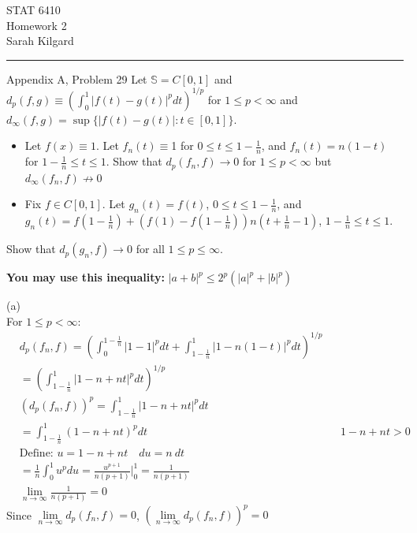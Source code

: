 \documentclass[12pt,letterpaper, onecolumn]{exam}
\newcommand{\Sbb}{\mathbb{S}}
\begin{document}
\begingroup  
    \centering
    \LARGE STAT 6410\\
    \LARGE Homework 2\\[0.5em]
    \large Sarah Kilgard\par
\endgroup
\rule{\textwidth}{0.4pt}
\pointsdroppedatright   %
\printanswers
\renewcommand{\solutiontitle}{\noindent\textbf{Ans:}\enspace}   %

\begin{questions}
    \question Appendix A, Problem 29
    Let $\Sbb = C[0, 1]$ and $d_p(f,g) \equiv (\int_0^1|f(t) - g(t)|^p dt)^{1/p}$ for $1 \leq p < \infty$ and $d_\infty(f,g) = \sup\{|f(t) - g(t)| : t \in [0, 1]\}$.
    \begin{itemize}
    \item[(a)] Let $f(x) \equiv 1$. Let $f_n(t) \equiv $1 for $0 \leq t \leq 1 - \frac{1}{n}$, and $f_n(t)=n(1-t)$ for $1 - \frac{1}{n} \leq t \leq 1$. Show that $d_p(f_n,f) \to 0$ for $1 \leq p < \infty$ but $d_\infty(f_n,f) \nrightarrow 0$
    \item[(b)] Fix $f \in C[0, 1]$. Let $g_n(t)=f(t)$, $0 \leq t \leq 1 - \frac{1}{n}$, and $g_n(t)= f(1 - \frac{1}{n})+(f(1) - f(1 - \frac{1}{n}))n(t + \frac{1}{n} - 1)$, $1 - \frac{1}{n} \leq t \leq 1$.
    \end{itemize}
    Show that $d_p(g_n,f) \to 0$  for all  $1\leq p \leq \infty$.

    \textbf{You may use this inequality:} $|a + b|^p \leq 2^p(|a|^p+|b|^p) $
    \begin{solution}
     (a) \\
     For $1 \leq p < \infty:$
     \begin{align*}
         & d_p(f_n, f) = \left(\int_0^{1-\tfrac{1}{n}}|1-1|^p dt + \int_{1-\tfrac{1}{n}}^1|1-n(1-t)|^p dt\right)^{1/p} \\
         & = \left(\int_{1-\tfrac{1}{n}}^1|1-n +nt|^p dt\right)^{1/p} \\
         & (d_p(f_n, f))^p = \int_{1-\tfrac{1}{n}}^1|1-n + nt|^p dt\\
         & = \int_{1-\tfrac{1}{n}}^1(1-n + nt)^p dt && 1-n + nt > 0 \\
         & \textrm{Define: } u = 1 - n + nt \quad du = n \: dt \\
         & = \frac{1}{n} \int_{0}^1 u^p du = \frac{u^{p+1}}{n(p+1)}\Big|_{0}^1 = \frac{1}{n(p+1)} \\
         & \lim\limits_{n \to \infty}\frac{1}{n(p+1)} = 0
     \end{align*}
     Since $\lim\limits_{n\to \infty}d_p(f_n, f) = 0$, $\left(\lim\limits_{n\to \infty}d_p(f_n, f)\right)^p = 0$


\end{solution}
\end{questions}
\end{document}
